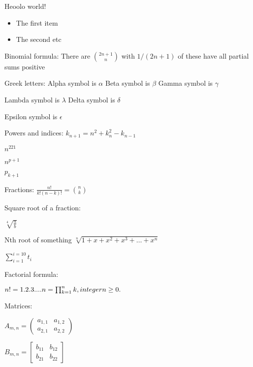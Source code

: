 \documentclass{article}
\begin{document}
Heoolo world!

\begin{itemize}
\item The first item
\item The second etc 
\end{itemize}

Binomial formula:
There are $\binom{2n+1}{n}$ with $1/(2n+1)$ of
these have all partial sums positive

Greek letters:
Alpha symbol is $\alpha$
Beta symbol is $\beta$
Gamma symbol is $\gamma$




Lambda symbol is $\lambda$
Delta symbol is $\delta$


Epsilon symbol is $\epsilon$


Powers and indices:
$k_{n+1} = n^2 + k_n^2 - k_{n-1}$

$n^{221}$

$n^{p+1}$

$p_{k+1}$

Fractions: 
$\frac{n!}{k!(n-k)!} = \binom{n}{k}$




Square root of a fraction:

$\sqrt[4]{\frac{a}{b}}$

Nth root of something
$\sqrt[n]{1+x+x^2+x^3+\dots+x^n}$


$\sum_{i=1}^{i=10} t_i$


Factorial formula:

$n! = 1.2.3....n = \prod_{k=1}^{n}k, \\ integer  n\geq0.$


Matrices:

$
A_{m,n} = \begin{pmatrix} a_{1,1} & a_{1,2} \\
  a_{2,1} & a_{2,2}
  \end{pmatrix}
  $

$
B_{m,n} = \begin{bmatrix} b_{11} & b_{12} \\
  b_{21} & b_{22}
  \end{bmatrix}
$
\end{document}
